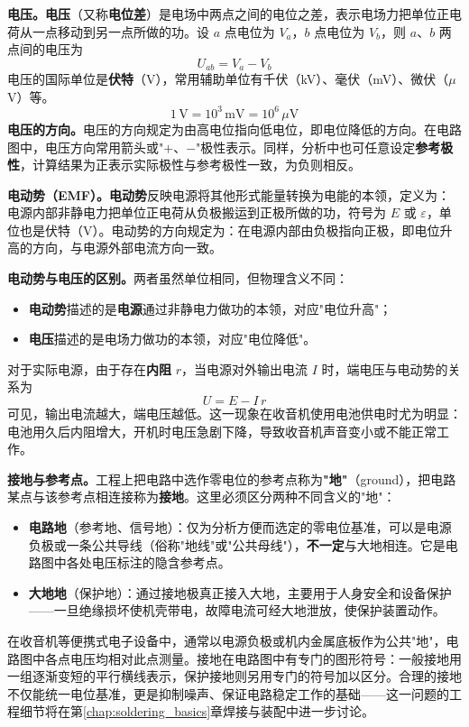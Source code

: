 \documentclass[12pt,UTF8]{ctexbook}
\begin{document}
\textbf{电压。}\textbf{电压}（又称\textbf{电位差}）是电场中两点之间的电位之差，表示电场力把单位正电荷从一点移动到另一点所做的功。设 $a$ 点电位为 $V_a$，$b$ 点电位为 $V_b$，则 $a$、$b$ 两点间的电压为
\[
U_{ab} = V_a - V_b
\]
电压的国际单位是\textbf{伏特}（V），常用辅助单位有千伏（kV）、毫伏（mV）、微伏（$\mu$V）等。
\[
1\,\mathrm{V}=10^3\,\mathrm{mV}=10^6\,\mu\mathrm{V}
\]
\textbf{电压的方向。}电压的方向规定为由高电位指向低电位，即电位降低的方向。在电路图中，电压方向常用箭头或"$+$、$-$"极性表示。同样，分析中也可任意设定\textbf{参考极性}，计算结果为正表示实际极性与参考极性一致，为负则相反。

\textbf{电动势（EMF）。}\textbf{电动势}反映电源将其他形式能量转换为电能的本领，定义为：电源内部非静电力把单位正电荷从负极搬运到正极所做的功，符号为 $E$ 或 $\varepsilon$，单位也是伏特（V）。电动势的方向规定为：在电源内部由负极指向正极，即电位升高的方向，与电源外部电流方向一致。

\textbf{电动势与电压的区别。}两者虽然单位相同，但物理含义不同：

\begin{itemize}
  \item \textbf{电动势}描述的是\textbf{电源}通过非静电力做功的本领，对应"电位升高"；
  \item \textbf{电压}描述的是电场力做功的本领，对应"电位降低"。
\end{itemize}

对于实际电源，由于存在\textbf{内阻} $r$，当电源对外输出电流 $I$ 时，端电压与电动势的关系为
\[
U = E - I\,r
\]
可见，输出电流越大，端电压越低。这一现象在收音机使用电池供电时尤为明显：电池用久后内阻增大，开机时电压急剧下降，导致收音机声音变小或不能正常工作。

\textbf{接地与参考点。}工程上把电路中选作零电位的参考点称为\textbf{"地"}（ground），把电路某点与该参考点相连接称为\textbf{接地}。这里必须区分两种不同含义的"地"：
\begin{itemize}
\item \textbf{电路地}（参考地、信号地）：仅为分析方便而选定的零电位基准，可以是电源负极或一条公共导线（俗称"地线"或"公共母线"），\textbf{不一定}与大地相连。它是电路图中各处电压标注的隐含参考点。
\item \textbf{大地地}（保护地）：通过接地极真正接入大地，主要用于人身安全和设备保护——一旦绝缘损坏使机壳带电，故障电流可经大地泄放，使保护装置动作。
\end{itemize}

在收音机等便携式电子设备中，通常以电源负极或机内金属底板作为公共"地"，电路图中各点电压均相对此点测量。接地在电路图中有专门的图形符号：一般接地用一组逐渐变短的平行横线表示，保护接地则另用专门的符号加以区分。合理的接地不仅能统一电位基准，更是抑制噪声、保证电路稳定工作的基础——这一问题的工程细节将在第\ref{chap:soldering_basics}章焊接与装配中进一步讨论。
\end{document}
